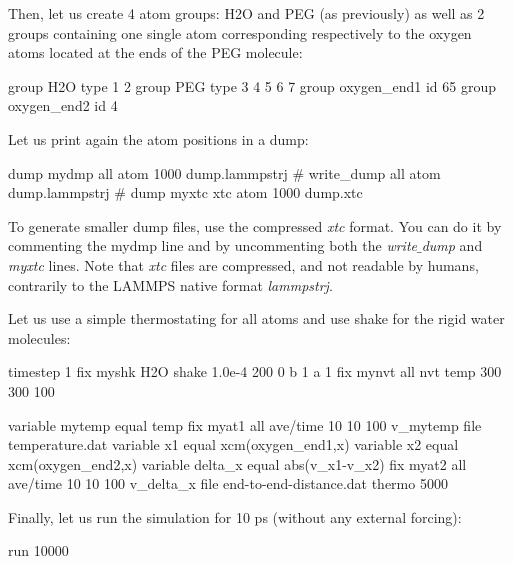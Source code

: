 \noindent Then, let us create 4 atom groups: H2O and PEG (as
previously) as well as 2 groups containing one single atom
corresponding respectively to the oxygen atoms located at the
ends of the PEG molecule:

\begin{lcverbatim}
group H2O type 1 2
group PEG type 3 4 5 6 7
group oxygen_end1 id 65
group oxygen_end2 id 4
\end{lcverbatim}

\noindent Let us print again the atom positions in a dump:

\begin{lcverbatim}
dump mydmp all atom 1000 dump.lammpstrj
# write_dump all atom dump.lammpstrj
# dump myxtc xtc atom 1000 dump.xtc
\end{lcverbatim}

\noindent \begin{tcolorbox}[colback=mylightblue!5!white,colframe=mylightblue!75!black,title=Use less disk space by using the xtc format]

To generate smaller dump files, use the
compressed \textit{xtc} format. You can do it by commenting the
mydmp line and by uncommenting both the \textit{write$\_$dump} and
\textit{myxtc} lines. Note that \textit{xtc} files are compressed, and not readable
by humans, contrarily to the LAMMPS native format \textit{lammpstrj}. 
\end{tcolorbox}

\noindent Let us use a simple thermostating for all atoms 
and use shake for the rigid water molecules:

\begin{lcverbatim}
timestep 1
fix myshk H2O shake 1.0e-4 200 0 b 1 a 1
fix mynvt all nvt temp 300 300 100
\end{lcverbatim}

\noindent \begin{lcverbatim}
variable mytemp equal temp
fix myat1 all ave/time 10 10 100 v_mytemp file temperature.dat
variable x1 equal xcm(oxygen_end1,x)
variable x2 equal xcm(oxygen_end2,x)
variable delta_x equal abs(v_x1-v_x2)
fix myat2 all ave/time 10 10 100 v_delta_x file end-to-end-distance.dat
thermo 5000
\end{lcverbatim}

\noindent Finally, let us run the simulation for 10 ps (without
any external forcing):

\begin{lcverbatim}
run 10000
\end{lcverbatim}

